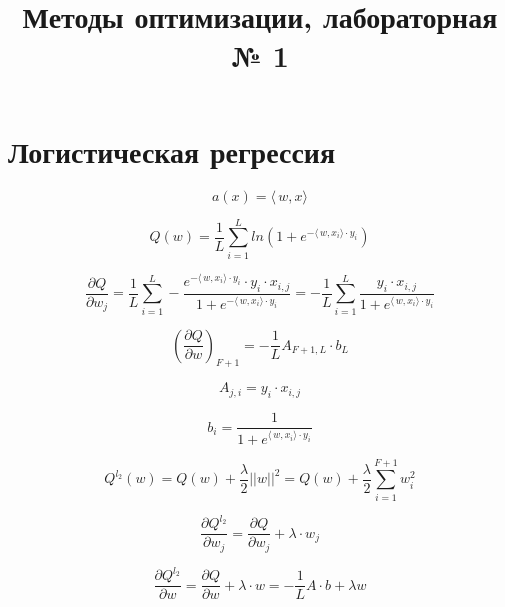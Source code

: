 \documentclass[12pt]{article}
\title{Методы оптимизации, лабораторная № 1}
\begin{document}
	\maketitle
	
\section{Логистическая регрессия}
$$a(x) = \langle\,w,x\rangle$$

$$Q(w) = \frac{1}{L}\sum\limits_{i = 1}^L ln(1 + e^{-\langle\,w,x_i\rangle\cdot y_i})$$

$$\frac{\partial Q}{\partial w_j} = \frac{1}{L}\sum\limits_{i = 1}^{L}-\frac{e^{-\langle\,w,x_i\rangle\cdot y_i} \cdot y_i \cdot x_{i, j}}{1 + e^{-\langle\,w,x_i\rangle\cdot y_i}} = -\frac{1}{L}\sum\limits_{i = 1}^{L}\frac{y_i \cdot x_{i, j}}{1 + e^{\langle\,w,x_i\rangle\cdot y_i}} $$

\[ 
\left( \frac{\partial Q}{\partial w} \right)_{F+1} =-\frac{1}{L} A_{F+1, L} \cdot b_{L}
\]

$$A_{j, i} = y_{i} \cdot x_{i, j}$$

$$b_i = \frac{1}{1 + e^{\langle\,w,x_i\rangle\cdot y_i}}$$

$$Q^{l_2}(w) = Q(w) + \frac{\lambda}{2}||w||^2 = Q(w) + \frac{\lambda}{2} \sum\limits_{i = 1}^{F+1}w_i^2$$

$$\frac{\partial Q^{l_2}}{\partial w_j} = \frac{\partial Q}{\partial w_j}  + \lambda \cdot w_j $$

$$\frac{\partial Q^{l_2}}{\partial w} = \frac{\partial Q}{\partial w}  + \lambda \cdot w = -\frac{1}{L} A \cdot b + \lambda w$$
\end{document}
